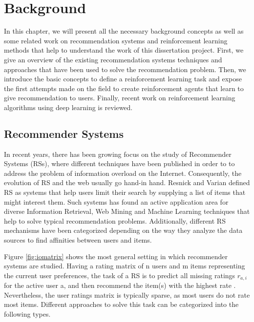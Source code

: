 \chapter{Background}
\label{sec:chapterlabel2}

In this chapter, we will present all the necessary background concepts as well as some related work on recommendation systems and reinforcement learning methods that help to understand the work of this dissertation project. First, we give an overview of the existing recommendation systems techniques and approaches that have been used to solve the recommendation problem. Then, we introduce the basic concepts to define a reinforcement learning task and expose the first attempts made on the field to create reinforcement agents that learn to give recommendation to users. Finally, recent work on reinforcement learning algorithms using deep learning is reviewed.

\section{Recommender Systems}

In recent years, there has been growing focus on the study of Recommender Systems (RSs), where different techniques have been published in order to to address the problem of information overload on the Internet. Consequently, the evolution of RS and the web usually go hand-in hand. Resnick and Varian \cite{resnick1997recommender}  defined RS as systems that help users limit their search by supplying a list of items that might interest them. Such systems has found an active application area for diverse Information Retrieval, Web Mining and Machine Learning techniques that help to solve typical recommendation problems. Additionally,  different RS mechanisms have been categorized depending on the way they analyze the data sources to find affinities between users and items. 

Figure \ref{fig:iomatrix} shows the most general setting in which recommender systems are studied. Having a rating matrix of n users and m items representing the current user preferences, the task of a RS is to predict all missing ratings $r_{a,i}$ for the active user a, and then recommend the item(s) with the highest rate \cite{melville2011recommender}. Nevertheless, the user ratings matrix is typically sparse, as most users do not rate most items. Different approaches to solve this task can be categorized into the following types.


